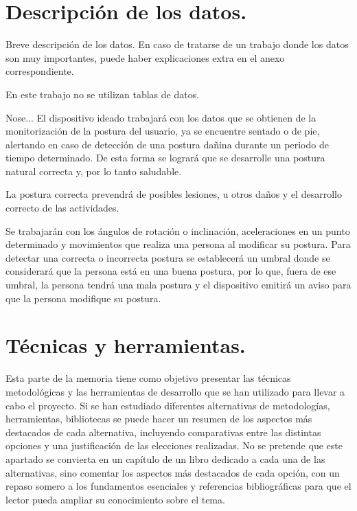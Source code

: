 
\section{Descripción de los datos.}
Breve descripción de los datos.
En caso de tratarse de un trabajo donde los datos son muy importantes, puede haber explicaciones extra en el anexo correspondiente.

En este trabajo no se utilizan tablas de datos.

Nose...
El dispositivo ideado trabajará con los datos que se obtienen de la monitorización de la postura del usuario, ya se encuentre sentado o de pie, alertando en caso de detección de una postura dañina durante un periodo de tiempo determinado. De esta forma se logrará que se desarrolle una postura natural correcta y, por lo tanto saludable. 

La postura correcta prevendrá de posibles lesiones, u otros daños y el desarrollo correcto de las actividades.

Se trabajarán con los ángulos de rotación o inclinación, aceleraciones en un punto determinado y movimientos que realiza una persona al modificar su postura. Para detectar una correcta o incorrecta postura se establecerá un umbral donde se considerará que la persona está en una buena postura, por lo que, fuera de ese umbral, la persona tendrá una mala postura y el dispositivo emitirá un aviso para que la persona modifique su postura.
 
\section{Técnicas y herramientas.}

Esta parte de la memoria tiene como objetivo presentar las técnicas metodológicas y las herramientas de desarrollo que se han utilizado para llevar a cabo el proyecto. Si se han estudiado diferentes alternativas de metodologías, herramientas, bibliotecas se puede hacer un resumen de los aspectos más destacados de cada alternativa, incluyendo comparativas entre las distintas opciones y una justificación de las elecciones realizadas. 
No se pretende que este apartado se convierta en un capítulo de un libro dedicado a cada una de las alternativas, sino comentar los aspectos más destacados de cada opción, con un repaso somero a los fundamentos esenciales y referencias bibliográficas para que el lector pueda ampliar su conocimiento sobre el tema.

